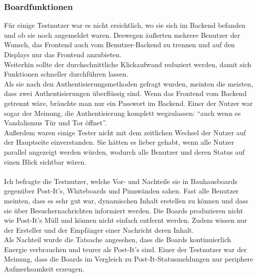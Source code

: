\subsubsection{Boardfunktionen}\label{Boardfunktionen}
Für einige Testnutzer war es nicht ersichtlich, wo sie sich im Backend befanden und ob sie noch angemeldet waren.
Deswegen äußerten mehrere Benutzer der Wunsch, das Frontend auch vom Benutzer-Backend zu trennen und auf den Displays nur das Frontend anzubieten.
\\
Weiterhin sollte der durchschnittliche Klickaufwand reduziert werden, damit sich Funktionen schneller durchführen lassen.
\\
Als sie nach den Authentisierungsmethoden gefragt wurden, meinten die meisten, dass zwei Authentisierungen überflüssig sind.
Wenn das Frontend vom Backend getrennt wäre, bräuchte man nur ein Passwort im Backend.
Einer der Nutzer war sogar der Meinung, die Authentisierung komplett wegzulassen: ``auch wenn es Vandalismus Tür und Tor öffnet''.
\\
Außerdem waren einige Tester nicht mit dem zeitlichen Wechsel der Nutzer auf der Hauptseite einverstanden.
Sie hätten es lieber gehabt, wenn alle Nutzer parallel angezeigt werden würden, wodurch alle Benutzer und deren Status auf einen Blick sichtbar wären.
\\
\\
Ich befragte die Testnutzer, welche Vor- und Nachteile sie in Bauhausboards gegenüber Post-It's, Whiteboards und Pinnwänden sahen.
Fast alle Benutzer meinten, dass es sehr gut war, dynamischen Inhalt erstellen zu können und dass sie über Besuchernachrichten informiert werden.
Die Boards produzieren nicht wie Post-It's Müll und können nicht einfach entfernt werden.
Zudem wissen nur der Ersteller und der Empfänger einer Nachricht deren Inhalt.
\\
Als Nachteil wurde die Tatsache angesehen, dass die Boards kontinuierlich Energie verbrauchen und teurer als Post-It's sind.
Einer der Testnutzer war der Meinung, dass die Boards im Vergleich zu Post-It-Statusmeldungen nur periphere Aufmerksamkeit erzeugen.


